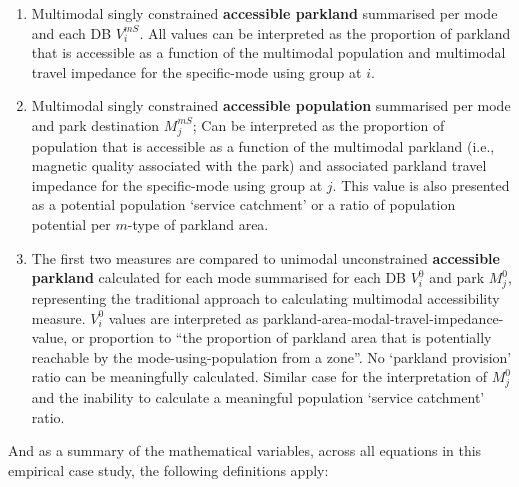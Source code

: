 \documentclass[
11pt, %
oneside, %
english, %
singlespacing, %
]{macthesis} %
\def\tightlist{}
\begin{document}
\begin{enumerate}
\def\labelenumi{\arabic{enumi}.}
\tightlist
\item
  Multimodal singly constrained \textbf{accessible parkland} summarised per mode and each DB \(V_i^{mS}\). All values can be interpreted as the proportion of parkland that is accessible as a function of the multimodal population and multimodal travel impedance for the specific-mode using group at \(i\).
\item
  Multimodal singly constrained \textbf{accessible population} summarised per mode and park destination \(M_j^{mS}\); Can be interpreted as the proportion of population that is accessible as a function of the multimodal parkland (i.e., magnetic quality associated with the park) and associated parkland travel impedance for the specific-mode using group at \(j\). This value is also presented as a potential population `service catchment' or a ratio of population potential per \(m\)-type of parkland area.
\item
  The first two measures are compared to unimodal unconstrained \textbf{accessible parkland} calculated for each mode summarised for each DB \(V_i^{0}\) and park \(M_j^{0}\), representing the traditional approach to calculating multimodal accessibility measure. \(V_i^{0}\) values are interpreted as parkland-area-modal-travel-impedance-value, or proportion to ``the proportion of parkland area that is potentially reachable by the mode-using-population from a zone''. No `parkland provision' ratio can be meaningfully calculated. Similar case for the interpretation of \(M_j^{0}\) and the inability to calculate a meaningful population `service catchment' ratio.
\end{enumerate}

And as a summary of the mathematical variables, across all equations in this empirical case study, the following definitions apply:
\end{document}
